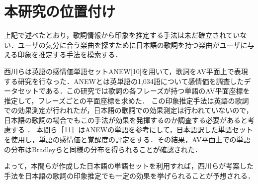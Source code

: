 \section{本研究の位置付け}
上記で述べたとおり，歌詞情報から印象を推定する手法は未だ確立されていない．ユーザの気分に合う楽曲を探すために日本語の歌詞を持つ楽曲がユーザに与える印象を推定する手法を模索する．

西川らは英語の感情価単語セットANEW[10]を用いて，歌詞をAV平面上で表現する研究を行なった．ANEWとは英単語の1,034語について感情価を調査したデータセットである．この研究では歌詞の各フレーズが持つ単語のAV平面座標を推定して，フレーズごとの平面座標を求めた．
この印象推定手法は英語の歌詞での効果測定が行われたが，日本語の歌詞での効果測定は行われていないので，日本語の歌詞の場合でもこの手法が効果を発揮するのか調査する必要があると考慮する
．
本間ら［11］はANEWの単語を参考にして，日本語訳した単語セットを使用し，単語の感情価と覚醒度の評定をする．その結果，AV平面上での単語の分布はBradleyらと同様の分布を得られることが確認された．

よって，本間らが作成した日本語の単語セットを利用すれば，西川らが考案した手法を日本語の歌詞の印象推定でも一定の効果を挙げられることが予想される．
